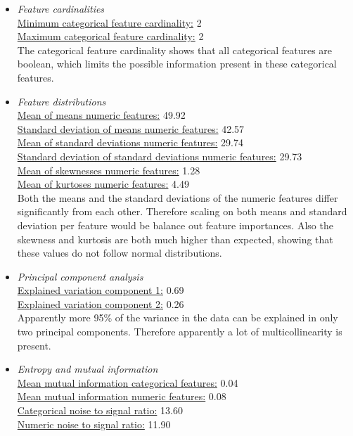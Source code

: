 \documentclass[10pt,a4paper]{report}
\begin{document}
\begin{itemize}
		\item \textit{Feature cardinalities} \\
		\underline{Minimum categorical feature cardinality:} 2 \\
		\underline{Maximum categorical feature cardinality:} 2 \\
		
		The categorical feature cardinality shows that all categorical features are boolean, which limits the possible information present in these categorical features.
		
		\item \textit{Feature distributions} \\
		\underline{Mean of means numeric features:} 49.92 \\
		\underline{Standard deviation of means numeric features:} 42.57 \\
		\underline{Mean of standard deviations numeric features:} 29.74 \\
		\underline{Standard deviation of standard deviations numeric features:} 29.73 \\
		\underline{Mean of skewnesses numeric features:} 1.28 \\
		\underline{Mean of kurtoses numeric features:} 4.49 \\
		
		Both the means and the standard deviations of the numeric features differ significantly from each other. Therefore scaling on both means and standard deviation per feature would be balance out feature importances. Also the skewness and kurtosis are both much higher than expected, showing that these values do not follow normal distributions.
		
		\item \textit{Principal component analysis} \\
		\underline{Explained variation component 1:} 0.69 \\
		\underline{Explained variation component 2:} 0.26 \\
		
		Apparently more 95\% of the variance in the data can be explained in only two principal components. Therefore apparently a lot of multicollinearity is present.
		
		\item \textit{Entropy and mutual information} \\
		\underline{Mean mutual information categorical features:} 0.04 \\
		\underline{Mean mutual information numeric features:} 0.08 \\
		\underline{Categorical noise to signal ratio:} 13.60 \\
		\underline{Numeric noise to signal ratio:} 11.90 \\
		

\end{itemize}
\end{document}
